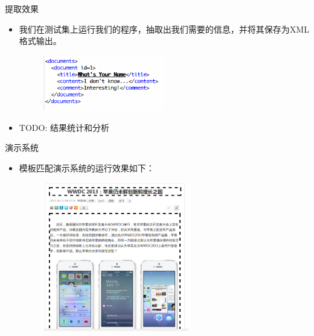 \documentclass[presentation]{beamer}
\begin{document}
\begin{frame}[label=sec-3-5]{提取效果}
\begin{itemize}
\item 我们在测试集上运行我们的程序，抽取出我们需要的信息，并将其保存为XML格式输出。
\begin{figure}[hb]
\centering
\includegraphics[width=0.5\textwidth]{xmloutput}
\end{figure}
\item TODO: 结果统计和分析
\end{itemize}
\end{frame}

\begin{frame}[label=sec-3-6]{演示系统}
\begin{itemize}
\item 模板匹配演示系统的运行效果如下：
\begin{figure}[hb]
  \centering
  \includegraphics[width=0.6\textwidth]{demoresult}
\end{figure}
\end{itemize}
\end{frame}
\end{document}
